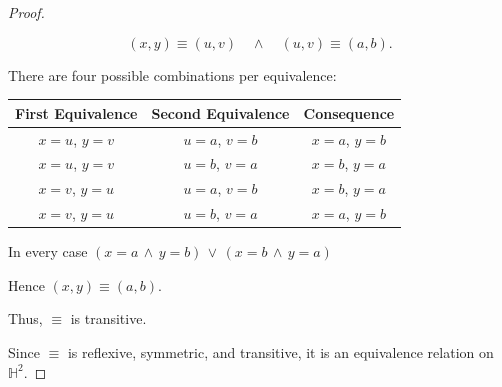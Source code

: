 \begin{theorem}
\begin{proof}
\begin{enumerate}
{                $$(x,y)\equiv(u,v) \quad \land \quad (u,v)\equiv(a,b).$$

                \medskip

                There are four possible combinations per equivalence:

                \medskip

                \begin{center}
                    \begin{tabular}{c|c|c}
                        \textbf{First Equivalence} &
                        \textbf{Second Equivalence} &
                        \textbf{Consequence} \\
                        \hline
                        $x=u$, $y=v$ &
                        $u=a$, $v=b$ &
                        $x=a$, $y=b$ \\

                        $x=u$, $y=v$ &
                        $u=b$, $v=a$ &
                        $x=b$, $y=a$ \\

                        $x=v$, $y=u$ &
                        $u=a$, $v=b$ &
                        $x=b$, $y=a$ \\

                        $x=v$, $y=u$ &
                        $u=b$, $v=a$ &
                        $x=a$, $y=b$
                    \end{tabular}
                \end{center}

                \medskip

                In every case $(x=a\,\land\,y=b)\,\lor\,(x=b\,\land\,y=a)$

                Hence $(x,y)\equiv(a,b)$.

                \medskip

                Thus, $\equiv$ is transitive.
            }
        \end{enumerate}
        Since $\equiv$ is reflexive, symmetric, and transitive, it is an equivalence relation on $\mathbb{H}^2$.
    \end{proof}
\end{theorem}

